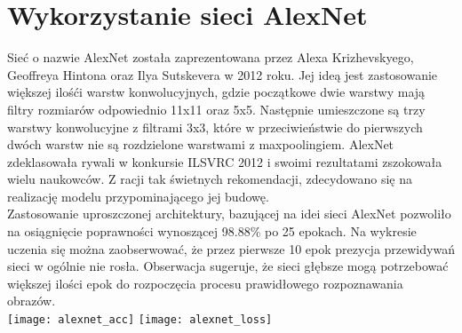 \section{Wykorzystanie sieci AlexNet}
Sieć o nazwie AlexNet została zaprezentowana przez Alexa Krizhevskyego, Geoffreya Hintona oraz
Ilya Sutskevera w 2012 roku. Jej ideą jest zastosowanie większej ilośći warstw konwolucyjnych,
gdzie początkowe dwie warstwy mają filtry rozmiarów odpowiednio 11x11 oraz 5x5. Następnie
umieszczone są trzy warstwy konwolucyjne z filtrami 3x3, które w przeciwieństwie do pierwszych
dwóch warstw nie są rozdzielone warstwami z maxpoolingiem. AlexNet zdeklasowała rywali
w konkursie ILSVRC 2012 i swoimi rezultatami zszokowała wielu naukowców. Z racji tak świetnych
rekomendacji, zdecydowano się na realizację modelu przypominającego jej budowę.\\
Zastosowanie uproszczonej architektury, bazującej na idei sieci AlexNet pozwoliło
na osiągnięcie poprawności wynoszącej 98.88\% po 25 epokach. Na wykresie uczenia się
można zaobserwować, że przez pierwsze 10 epok prezycja przewidywań sieci w ogólnie nie
rosła. Obserwacja sugeruje, że sieci głębsze mogą potrzebować większej ilości epok
do rozpoczęcia procesu prawidłowego rozpoznawania obrazów.\\
\texttt{[image: alexnet\_acc]}
\texttt{[image: alexnet\_loss]}

